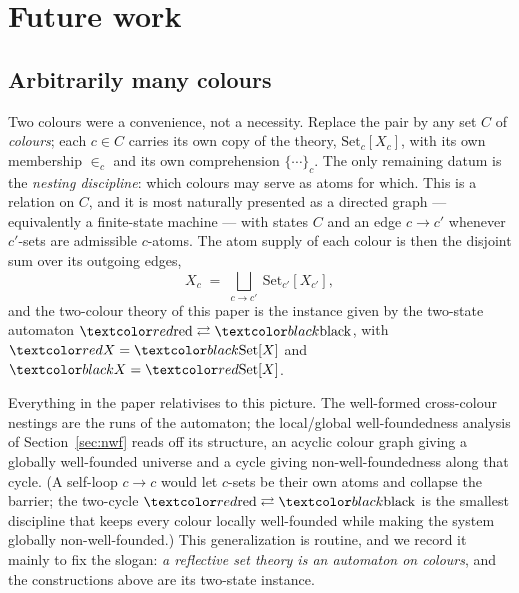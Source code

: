
\section{Future work}
\label{sec:future}

\subsection{Arbitrarily many colours}
\label{sec:future:palette}

Two colours were a convenience, not a necessity. Replace the pair by any set $C$
of \emph{colours}; each $c\in C$ carries its own copy of the theory,
$\mathrm{Set}_c[X_c]$, with its own membership $\in_c$ and its own comprehension
$\{\cdots\}_c$. The only remaining datum is the \emph{nesting discipline}: which
colours may serve as atoms for which. This is a relation on $C$, and it is most
naturally presented as a directed graph --- equivalently a finite-state machine
--- with states $C$ and an edge $c\to c'$ whenever $c'$-sets are admissible
$c$-atoms. The atom supply of each colour is then the disjoint sum over its
outgoing edges,
\[
  X_c \;=\; \bigsqcup_{c\to c'}\ \mathrm{Set}_{c'}[X_{c'}],
\]
and the two-colour theory of this paper is the instance given by the two-state
automaton $\rd{\mathrm{red}} \rightleftarrows \bk{\mathrm{black}}$, with
$\rX=\bSetX$ and $\bX=\rSetX$.

Everything in the paper relativises to this picture. The well-formed cross-colour
nestings are the runs of the automaton; the local/global well-foundedness analysis
of Section~\ref{sec:nwf} reads off its structure, an acyclic colour graph giving a
globally well-founded universe and a cycle giving non-well-foundedness along that
cycle. (A self-loop $c\to c$ would let $c$-sets be their own atoms and collapse
the barrier; the two-cycle $\rd{\mathrm{red}}\rightleftarrows\bk{\mathrm{black}}$
is the smallest discipline that keeps every colour locally well-founded while
making the system globally non-well-founded.) This generalization is routine, and
we record it mainly to fix the slogan: \emph{a reflective set theory is an
automaton on colours}, and the constructions above are its two-state instance.

